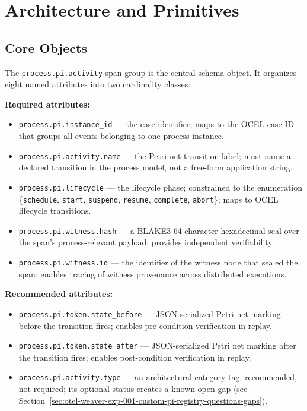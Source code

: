 
\section{Architecture and Primitives}
\label{sec:otel-weaver-exp-001-custom-pi-registry-architecture}

\subsection{Core Objects}
\label{sec:otel-weaver-exp-001-custom-pi-registry-architecture-objects}

The \texttt{process.pi.activity} span group is the central schema object. It organizes eight
named attributes into two cardinality classes:

\textbf{Required attributes:}
\begin{itemize}
  \item \texttt{process.pi.instance\_id} --- the case identifier; maps to the OCEL case ID that
        groups all events belonging to one process instance.
  \item \texttt{process.pi.activity.name} --- the Petri net transition label; must name a
        declared transition in the process model, not a free-form application string.
  \item \texttt{process.pi.lifecycle} --- the lifecycle phase; constrained to the enumeration
        \{\texttt{schedule}, \texttt{start}, \texttt{suspend}, \texttt{resume},
        \texttt{complete}, \texttt{abort}\}; maps to OCEL lifecycle transitions.
  \item \texttt{process.pi.witness.hash} --- a BLAKE3 64-character hexadecimal seal over the
        span's process-relevant payload; provides independent verifiability.
  \item \texttt{process.pi.witness.id} --- the identifier of the witness node that sealed the
        span; enables tracing of witness provenance across distributed executions.
\end{itemize}

\textbf{Recommended attributes:}
\begin{itemize}
  \item \texttt{process.pi.token.state\_before} --- JSON-serialized Petri net marking before the
        transition fires; enables pre-condition verification in replay.
  \item \texttt{process.pi.token.state\_after} --- JSON-serialized Petri net marking after the
        transition fires; enables post-condition verification in replay.
  \item \texttt{process.pi.activity.type} --- an architectural category tag; recommended, not
        required; its optional status creates a known open gap (see Section~\ref{sec:otel-weaver-exp-001-custom-pi-registry-questions-gaps}).
\end{itemize}


